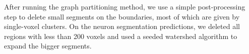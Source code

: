 After running the graph partitioning method, we use a simple post-processing step to delete small segments on the boundaries, most of which are given by single-voxel clusters. On the neuron segmentation predictions, we deleted all regions with less than 200 voxels and used a seeded watershed algorithm to expand the bigger segments.

  









